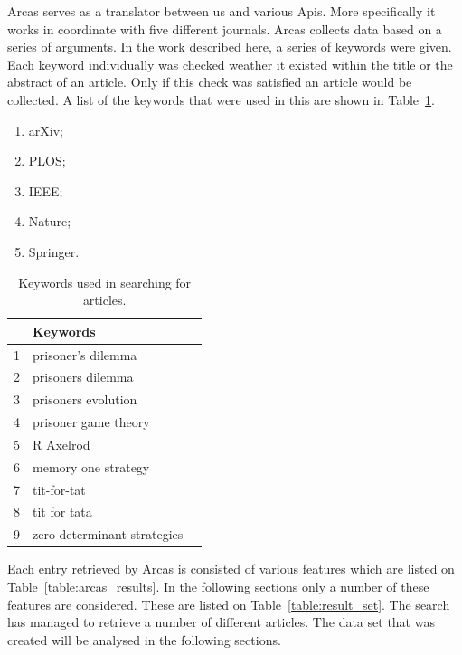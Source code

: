 \documentclass{article}
\begin{document}
Arcas serves as a translator between us and various Apis. More specifically it
works in coordinate with five different journals. Arcas collects data based on 
a series of arguments. In the work described here, a series of keywords were given.
Each keyword individually was checked weather it existed within the title or the
abstract of an article. Only if this check was satisfied an article would be collected.
A list of the keywords that were used in this are shown in Table~\ref{table:search_keywords}.

\begin{multicols}{3}
    \begin{enumerate}
        \item arXiv;
        \item PLOS;
        \item IEEE;
        \item Nature;
        \item Springer.
    \end{enumerate}
\end{multicols}

\begin{table}[!hbtp]
    \begin{center}
        \begin{tabular}{lll}
            \toprule
             & Keywords & \\
            \midrule
             1 &  prisoner's dilemma & \\
             2 &  prisoners dilemma  & \\
             3 &  prisoners evolution & \\
             4 &  prisoner game theory & \\
             5 &  R Axelrod & \\
             6 &  memory one strategy & \\
             7 & tit-for-tat & \\
             8 & tit for tata & \\
             9 & zero determinant strategies & \\
            \bottomrule
        \end{tabular}
    \end{center}
    \caption{Keywords used in searching for articles.}
    \label{table:search_keywords}
\end{table}

Each entry retrieved by Arcas is consisted of various features which are 
listed on Table~\ref{table:arcas_results}. In the following sections only a number
of these features are considered. These are listed on Table~\ref{table:result_set}.
The search has managed to retrieve a number of different articles. The data set
that was created will be analysed in the following sections.
\end{document}
